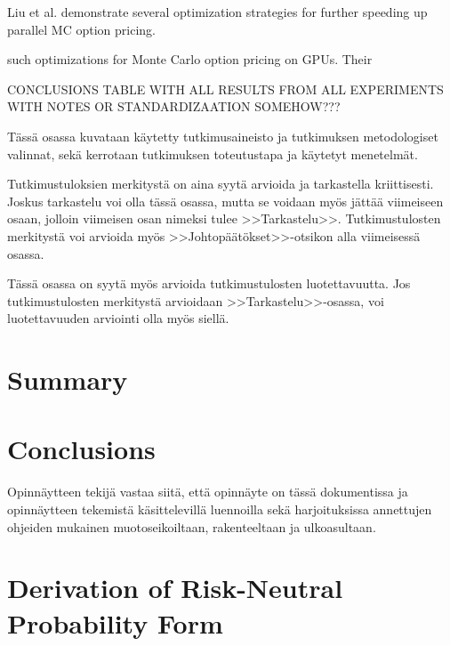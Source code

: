 \documentclass[english,12pt,a4paper,pdftex,sci,utf8]{aaltothesis}
\begin{document}
Liu et al. \cite{liu2010efficient} demonstrate several optimization strategies for further speeding up parallel MC option pricing. 

such optimizations for Monte Carlo option pricing on GPUs. Their 



CONCLUSIONS TABLE WITH ALL RESULTS FROM ALL EXPERIMENTS WITH NOTES OR STANDARDIZAATION  SOMEHOW???

T\"ass\"a osassa kuvataan k\"aytetty tutkimusaineisto ja
tutkimuksen metodologiset valinnat, sek\"a
kerrotaan tutkimuksen toteutustapa ja k\"aytetyt menetelm\"at. 

\clearpage


Tutkimustuloksien merkityst\"a on aina syyt\"a arvioida ja tarkastella
kriittisesti.  Joskus tarkastelu voi olla t\"ass\"a osassa, mutta se
voidaan my\"os j\"att\"a\"a viimeiseen osaan, jolloin viimeisen osan nimeksi
tulee >>Tarkastelu>>. Tutkimustulosten merkityst\"a voi arvioida my\"os
>>Johtop\"a\"at\"okset>>-otsikon alla viimeisess\"a osassa. 

T\"ass\"a osassa on syyt\"a my\"os arvioida tutkimustulosten luotettavuutta.
Jos tutkimustulosten merkityst\"a arvioidaan >>Tarkastelu>>-osassa,
voi luotettavuuden arviointi olla my\"os siell\"a. 

\clearpage

\section{Summary}  \label{sec:summary}

\section{Conclusions}  \label{sec:conclusions}


Opinn\"aytteen tekij\"a vastaa siit\"a, ett\"a opinn\"ayte on t\"ass\"a dokumentissa
ja opinn\"aytteen tekemist\"a k\"asittelevill\"a luennoilla sek\"a
harjoituksissa annettujen ohjeiden mukainen muotoseikoiltaan,
rakenteeltaan ja ulkoasultaan.\cite{grochowski2004best}


\cleardoublepage

\appendix
\section{Derivation of Risk-Neutral Probability Form}  %
\label{appendix:risk_neutral_derivation}
\end{document}
